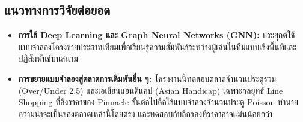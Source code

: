 \subsection{แนวทางการวิจัยต่อยอด}

\begin{itemize}
    \item \textbf{การใช้ Deep Learning และ Graph Neural Networks (GNN):} ประยุกต์ใช้แบบจำลองโครงข่ายประสาทเทียมเพื่อเรียนรู้ความสัมพันธ์ระหว่างผู้เล่นในทีมแบบเชิงพื้นที่และปฏิสัมพันธ์บนสนาม
    \item \textbf{การขยายแบบจำลองสู่ตลาดการเดิมพันอื่น ๆ:} โครงงานนี้ทดสอบตลาดจำนวนประตูรวม (Over/Under 2.5) และเอเชียนแฮนดิแคป (Asian Handicap) เฉพาะกลยุทธ์ Line Shopping ที่อิงราคาของ Pinnacle ขั้นต่อไปคือใช้แบบจำลองจำนวนประตู Poisson ทำนายความน่าจะเป็นของตลาดเหล่านี้โดยตรง และทดสอบกับลีกรองที่ราคาอาจแม่นน้อยกว่า
\end{itemize}